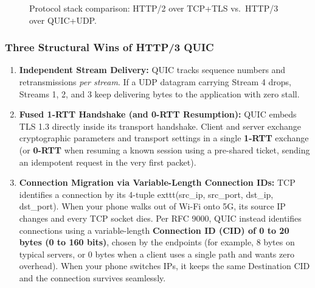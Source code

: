 \begin{figure}[htbp]
\centering
{}
\caption{Protocol stack comparison: HTTP/2 over TCP+TLS vs.\ HTTP/3 over QUIC+UDP.}
\label{fig:v1-ch01-http3-stack}
\end{figure}

\subsubsection{Three Structural Wins of HTTP/3 QUIC}
\begin{enumerate}[leftmargin=15pt]
  \item \textbf{Independent Stream Delivery:} QUIC tracks sequence numbers and retransmissions \emph{per stream}. If a UDP datagram carrying Stream 4 drops, Streams 1, 2, and 3 keep delivering bytes to the application with zero stall.
  \item \textbf{Fused 1-RTT Handshake (and 0-RTT Resumption):} QUIC embeds TLS 1.3 directly inside its transport handshake. Client and server exchange cryptographic parameters and transport settings in a single \textbf{1-RTT} exchange (or \textbf{0-RTT} when resuming a known session using a pre-shared ticket, sending an idempotent request in the very first packet).
  \item \textbf{Connection Migration via Variable-Length Connection IDs:} TCP identifies a connection by its 4-tuple 	exttt{(src\_ip, src\_port, dst\_ip, dst\_port)}. When your phone walks out of Wi-Fi onto 5G, its source IP changes and every TCP socket dies. Per RFC 9000, QUIC instead identifies connections using a variable-length \textbf{Connection ID (CID) of 0 to 20 bytes (0 to 160 bits)}, chosen by the endpoints (for example, 8 bytes on typical servers, or 0 bytes when a client uses a single path and wants zero overhead). When your phone switches IPs, it keeps the same Destination CID and the connection survives seamlessly.
\end{enumerate}

